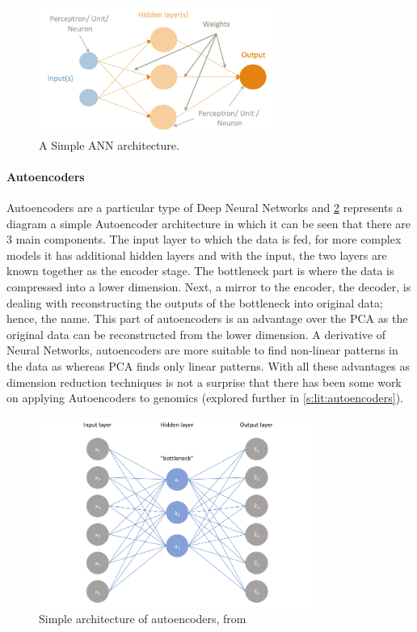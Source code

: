 \begin{figure}[!htb]
  \centering\includegraphics[width=0.7\textwidth,height=0.7\textheight,keepaspectratio]{Images/ANN/Basic_ANN.png}
    \caption{A Simple ANN architecture. }
    \label{fig:ann_basic}
\end{figure}
\FloatBarrier


\paragraph*{Autoencoders} \label{s:lit:autoencod_overview}

Autoencoders are a particular type of Deep Neural Networks and \cref{fig:autoencoders} represents a diagram a simple Autoencoder architecture in which it can be seen that there are 3 main components. The input layer to which the data is fed, for more complex models it has additional hidden layers and with the input, the two layers are known together as the encoder stage. The bottleneck part is where the data is compressed into a lower dimension. Next, a mirror to the encoder, the decoder, is dealing with reconstructing the outputs of the bottleneck into original data; hence, the name. This part of autoencoders is an advantage over the PCA as the original data can be reconstructed from the lower dimension. A derivative of Neural Networks, autoencoders are more suitable to find non-linear patterns in the data as whereas PCA finds only linear patterns. With all these advantages as dimension reduction techniques is not a surprise that there has been some work on applying Autoencoders to genomics (explored further in \cref{s:lit:autoencoders}).

\begin{figure}[!htb]
  \centering\includegraphics[width=0.8\textwidth,height=0.5\textheight,keepaspectratio]{Images/Autoencoders/simple_autoencoders.png}
    \caption{Simple architecture of autoencoders, from \cite{Jordan2018-bc}}
    \label{fig:autoencoders}
\end{figure}
\FloatBarrier

